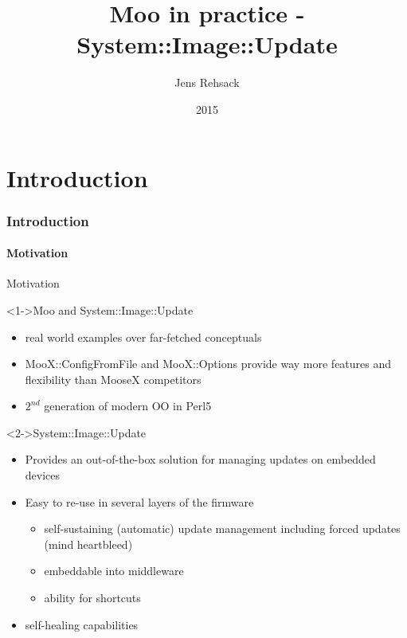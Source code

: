 \documentclass[ngerman,xcolor={table,dvipsnames},smaller,compress,hyperref={bookmarks,colorlinks}]{beamer}%
\title{Moo in practice - System::Image::Update}
\author{Jens Rehsack}
\institute[Niederrhein.PM]{Niederrhein Perl Mongers}
\date{2015}
\begin{document}


\frame{\maketitle}

\part{Introduction}

\section{Introduction}

\subsection{Motivation}

\begin{frame}[t,fragile]{Motivation}

\begin{block}<1->{Moo and System::Image::Update}
\begin{itemize}
\item real world examples over far-fetched conceptuals
\item MooX::ConfigFromFile and MooX::Options provide way more features and flexibility than MooseX competitors
\item $ 2^{nd} $ generation of modern OO in Perl5
\end{itemize}
\end{block}

\begin{block}<2->{System::Image::Update}
\begin{itemize}
\item Provides an out-of-the-box solution for managing updates on embedded devices
\item Easy to re-use in several layers of the firmware
    \begin{itemize}
    \item self-sustaining (automatic) update management including forced updates (mind heartbleed)
    \item embeddable into middleware
    \item ability for shortcuts
    \end{itemize}
\item self-healing capabilities
\end{itemize}
\end{block}

\end{frame}
\end{document}
